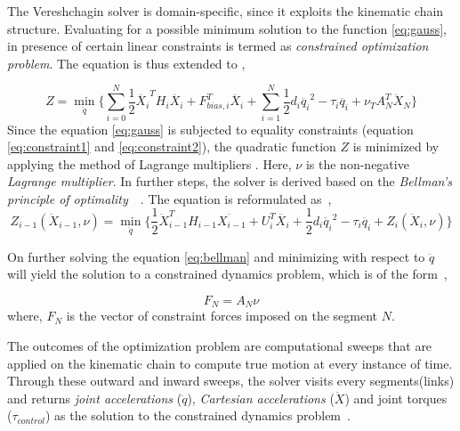 The Vereshchagin solver is domain-specific, since it exploits the kinematic chain structure. Evaluating for a possible minimum solution to the function \ref{eq:gauss}, in presence of certain linear constraints is termed as \textit{constrained optimization problem}. The equation is thus extended to \cite{shakhimardanov2015composable}, 

 \begin{equation} \label{eq:minimization}
 Z = \min_{\ddot{q}} \Big \{\sum_{i=0}^{N} \frac{1}{2} \ddot{X_i}^T H_i \ddot{X_i} + F_{bias, i}^T\ddot{X_i} + \sum_{i=1}^{N} \frac{1}{2} d_i \ddot{q_i}^2 - \tau_i \ddot{q_i} + \nu_T A^T_N \ddot{X}_N \Big \}
 \end{equation} 
Since the equation \ref{eq:gauss} is subjected to equality constraints (equation \ref{eq:constraint1} and \ref{eq:constraint2}), the quadratic function $Z$ is minimized by applying the method of Lagrange multipliers \cite{bertsekas2014constrained}. Here, $\nu$ is the non-negative \textit{Lagrange multiplier}. In further steps, the solver is derived based on the \textit{Bellman's principle of optimality}~\cite{bertsekas1996dynamic}~\cite{bellman2013dynamic}. The equation is reformulated  as~\cite{shakhimardanov2015composable},
 \begin{equation} \label{eq:bellman}
 Z_{i-1}(\ddot{X}_{i-1}, \nu) = \min_{\ddot{q}} \Big \{ \frac{1}{2} \ddot{X}_{i-1}^T H_{i-1} \ddot{X_{i-1}} + U_i^T\ddot{X_i} + \frac{1}{2} d_i \ddot{q_i}^2 - \tau_i \ddot{q_i} + Z_i(\ddot{X}_i, \nu)\Big \}
 \end{equation} 
 
 On further solving the equation \ref{eq:bellman} and minimizing with respect to $\ddot{q}$ will yield the solution to a constrained dynamics problem, which is of the form~\cite{shakhimardanov2015composable}, 
 
  \begin{equation}\label{eq:solution}
  F_N = A_N \nu
  \end{equation}
where, $F_N$ is the vector of constraint forces imposed on the segment $N$.


The outcomes of the optimization problem are computational sweeps that are applied on the kinematic chain to compute true motion at every instance of time. Through these outward and inward sweeps, the solver visits every segments(links) and returns \textit{joint accelerations} ($\ddot{q}$), \textit{Cartesian accelerations} ($\ddot{X}$) and joint torques ($\tau_{control}$) as the solution to the constrained dynamics problem~\cite{shakhimardanov2015composable}. 

